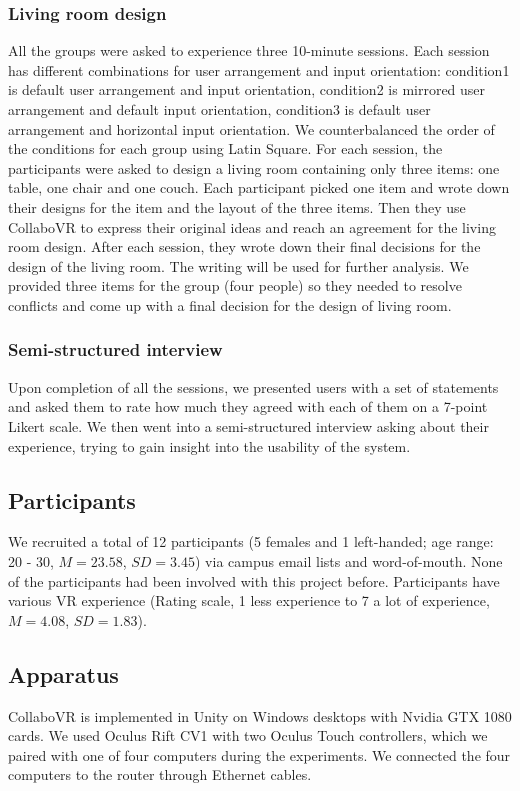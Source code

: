 \documentclass{sigchi}
\begin{document}
\subsubsection{Living room design}
All the groups were asked to experience three 10-minute sessions. 
Each session has different combinations for user arrangement and input orientation: condition1 is default user arrangement and input orientation, condition2 is mirrored user arrangement and default input orientation, condition3 is default user arrangement and horizontal input orientation.
We counterbalanced the order of the conditions for each group using Latin Square. For each session, the participants were asked to design a living room containing only three items: one table, one chair and one couch. 
Each participant picked one item and wrote down their designs for the item and the layout of the three items. Then they use CollaboVR to express their original ideas and reach an agreement for the living room design. After each session, they wrote down their final decisions for the design of the living room. The writing will be used for further analysis.
We provided three items for the group (four people) so they needed to resolve conflicts and come up with a final decision for the design of living room.

\subsubsection{Semi-structured interview}
Upon completion of all the sessions, we presented users with a set of statements and asked them to rate how much they agreed with each of them on a 7-point Likert scale. We then went into a semi-structured interview asking about their experience, trying to gain insight into the usability of the system.

\subsection{Participants}
We recruited a total of 12 participants (5 females and 1 left-handed; age range: 20 - 30, $M=23.58$, $SD=3.45$) via campus email lists and word-of-mouth. None of the participants had been involved with this project before. Participants have various VR experience (Rating scale, 1 less experience to 7 a lot of experience, $M=4.08$, $SD=1.83$).

\subsection{Apparatus}
CollaboVR is implemented in Unity on Windows desktops with Nvidia GTX 1080 cards. We used Oculus Rift CV1 with two Oculus Touch controllers, which we paired with one of four computers during the experiments. We connected the four computers to the router through Ethernet cables.
\end{document}

